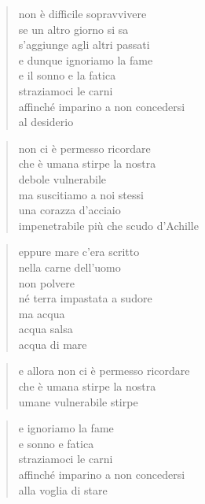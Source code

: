 	\begin{verse}
		non è difficile sopravvivere\\
		se un altro giorno si sa\\
		s’aggiunge agli altri passati\\
                e dunque ignoriamo la fame\\
                e il sonno e la fatica\\
                straziamoci le carni\\
                affinché imparino a non concedersi\\
                al desiderio
	\end{verse}

	\begin{verse}
                non ci è permesso ricordare\\
                che è umana stirpe la nostra\\
                debole vulnerabile\\
                ma suscitiamo a noi stessi\\
                una corazza d'acciaio\\
                impenetrabile più che scudo d'Achille
	\end{verse}

\clearpage


\vspace*{2cm}

	\begin{verse}
		eppure mare c’era scritto\\
		nella carne dell’uomo\\
		non polvere\\
		né terra impastata a sudore\\
		ma acqua\\
		acqua salsa\\
		acqua di mare
	\end{verse}

	\begin{verse}
		e allora non ci è permesso ricordare\\
		che è umana stirpe la nostra\\
		umane vulnerabile stirpe
	\end{verse}

	\begin{verse}
		e ignoriamo la fame\\
		e sonno e fatica\\
		straziamoci le carni\\
		affinché imparino a non concedersi\\
		alla voglia di stare
	\end{verse}


